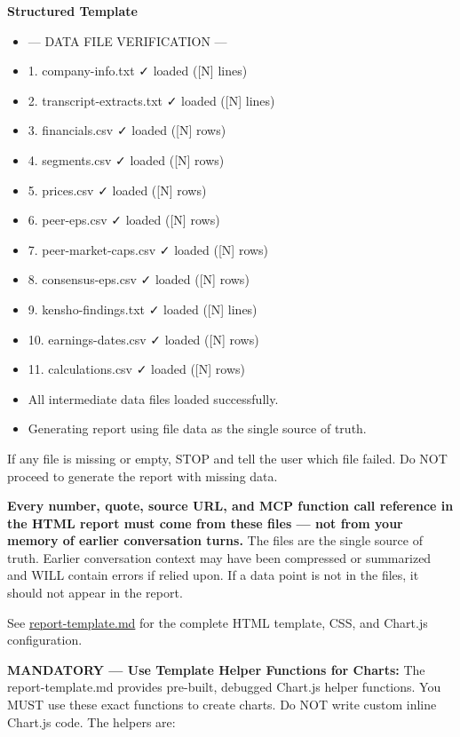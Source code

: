 \documentclass[11pt]{article}
\begin{document}
\textbf{Structured Template}
\begin{itemize}[leftmargin=*,itemsep=2pt,topsep=2pt]
\item {} --- DATA FILE VERIFICATION ---
\item {} 1. company-info.txt ✓ loaded ([N] lines)
\item {} 2. transcript-extracts.txt ✓ loaded ([N] lines)
\item {} 3. financials.csv ✓ loaded ([N] rows)
\item {} 4. segments.csv ✓ loaded ([N] rows)
\item {} 5. prices.csv ✓ loaded ([N] rows)
\item {} 6. peer-eps.csv ✓ loaded ([N] rows)
\item {} 7. peer-market-caps.csv ✓ loaded ([N] rows)
\item {} 8. consensus-eps.csv ✓ loaded ([N] rows)
\item {} 9. kensho-findings.txt ✓ loaded ([N] lines)
\item {} 10. earnings-dates.csv ✓ loaded ([N] rows)
\item {} 11. calculations.csv ✓ loaded ([N] rows)
\item {} All intermediate data files loaded successfully.
\item {} Generating report using file data as the single source of truth.
\end{itemize}

If any file is missing or empty, STOP and tell the user which file failed. Do NOT proceed to generate the report with missing data.


\textbf{Every number, quote, source URL, and MCP function call reference in the HTML report must come from these files — not from your memory of earlier conversation turns.} The files are the single source of truth. Earlier conversation context may have been compressed or summarized and WILL contain errors if relied upon. If a data point is not in the files, it should not appear in the report.


See \href{report-template.md}{report-template.md} for the complete HTML template, CSS, and Chart.js configuration.


\textbf{MANDATORY — Use Template Helper Functions for Charts:} The report-template.md provides pre-built, debugged Chart.js helper functions. You MUST use these exact functions to create charts. Do NOT write custom inline Chart.js code. The helpers are:
\end{document}
